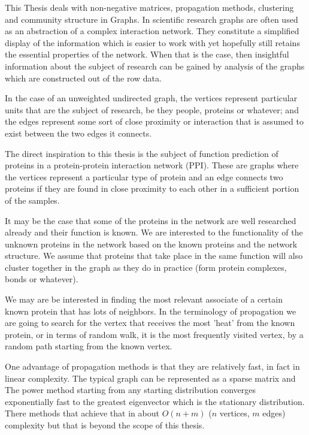 \documentclass[a4paper,10pt]{article}
\theoremstyle{definition}
\theoremstyle{remark}
\theoremstyle{plain}
\begin{document}

This Thesis deals with non-negative matrices, propagation methods, clustering
and community structure in Graphs. In scientific research graphs are often used
as an abstraction of a complex interaction network. They constitute a simplified
display of the information which is easier to work with yet hopefully still
retains the essential properties of the network. When that is the case, then
insightful information about the subject of research can be gained by analysis
of the graphs which are constructed out of the row data.

In the case of an unweighted undirected graph, the vertices represent particular
units that are the subject of research, be they people, proteins or whatever;
and the edges represent some sort of close proximity or interaction that is
assumed to exist between the two edges it connects.

The direct inspiration to this thesis is the subject of function prediction 
of proteins in a protein-protein interaction network (PPI). These are graphs
where the vertices represent a particular type of protein and an edge connects
two proteins if they are found in close proximity to each other in a sufficient
portion of the samples. 

It may be the case that some of the proteins in the network are well researched
already and their function is known. We are interested to the functionality of
the unknown proteins in the network based on the known proteins and the network
structure. We assume that proteins that take place in the same function will
also cluster together in the graph as they do in practice (form protein
complexes, bonds or whatever).

We may are be interested in finding the most relevant associate of a certain
known protein that has lots of neighbors. In the terminology of propagation we
are going to search for the vertex that receives the most 'heat' from the known
protein, or in terms of random walk, it is the most frequently visited vertex,
by a random path starting from the known vertex.

One advantage of propagation methods is that they are relatively fast, in fact
in linear complexity. The typical graph can be represented as a sparse matrix
and The power method starting from any starting distribution converges
exponentially fast to the greatest eigenvector which is the stationary
distribution. There methods that achieve that in about $O(n + m)$  ($n$
vertices, $m$ edges) complexity but that is beyond the scope of this thesis.
\end{document}
